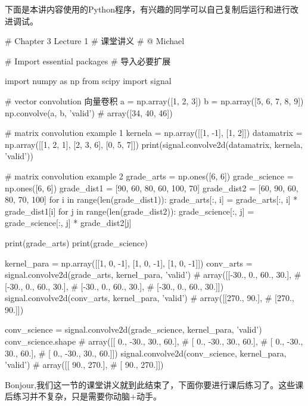 \documentclass[12pt]{article}
\numberwithin{equation}{section}
\numberwithin{figure}{section}
\begin{document}
\noindent
下面是本讲内容使用的Python程序，有兴趣的同学可以自己复制后运行和进行改进调试。
\begin{python}
# Chapter 3 Lecture 1
# 课堂讲义
# @ Michael

# Import essential packages
# 导入必要扩展

import numpy as np
from scipy import signal

# vector convolution 向量卷积
a = np.array([1, 2, 3])
b = np.array([5, 6, 7, 8, 9])
np.convolve(a, b, 'valid')  # array([34, 40, 46])

# matrix convolution example 1
kernela = np.array([[1, -1], [1, 2]])
datamatrix = np.array([[1, 2, 1], [2, 3, 6], [0, 5, 7]])
print(signal.convolve2d(datamatrix, kernela, 'valid'))

# matrix convolution example 2
grade_arts = np.ones([6, 6])
grade_science = np.ones([6, 6])
grade_dist1 = [90, 60, 80, 60, 100, 70]
grade_dist2 = [60, 90, 60, 80, 70, 100]
for i in range(len(grade_dist1)):
    grade_arts[:, i] = grade_arts[:, i] * grade_dist1[i]
for j in range(len(grade_dist2)):
    grade_science[:, j] = grade_science[:, j] * grade_dist2[j]

print(grade_arts)
print(grade_science)

kernel_para = np.array([[1, 0, -1], [1, 0, -1], [1, 0, -1]])
conv_arts = signal.convolve2d(grade_arts, kernel_para, 'valid')
# array([[-30.,   0.,  60.,  30.],
#        [-30.,   0.,  60.,  30.],
#        [-30.,   0.,  60.,  30.],
#        [-30.,   0.,  60.,  30.]])
signal.convolve2d(conv_arts, kernel_para, 'valid')
# array([[270.,  90.],
#        [270.,  90.]])


conv_science = signal.convolve2d(grade_science, kernel_para, 'valid')
conv_science.shape
# array([[  0., -30.,  30.,  60.],
#        [  0., -30.,  30.,  60.],
#        [  0., -30.,  30.,  60.],
#        [  0., -30.,  30.,  60.]])
signal.convolve2d(conv_science, kernel_para, 'valid')
# array([[ 90., 270.],
#        [ 90., 270.]])
\end{python}


Bonjour,我们这一节的课堂讲义就到此结束了，下面你要进行课后练习了。这些课后练习并不复杂，只是需要你动脑+动手。

\hfil
\end{document}
